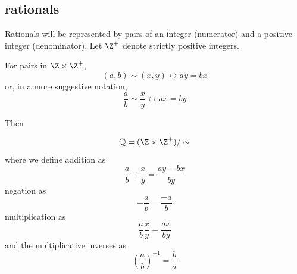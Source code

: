 \documentclass{scrbook}
\renewcommand{\iff}{\leftrightarrow}
\newcommand{\Q}{\mathbb{Q}}
\begin{document}
\subsection[Rationals]{rationals}
Rationals will be represented by pairs of an integer (numerator) and a positive integer (denominator). Let $\Z^+$ denote strictly positive integers. 
\begin{defn}[\sim]
  For pairs in $\Z\times \Z^+$,
  \[
  (a,b)\sim(x,y) \iff ay=bx
  \]
  or, in a more suggestive notation, 
  \[
  \frac a b \sim \frac x y \iff ax = by
  \]
\end{defn}
Then
\begin{defn}[$\Q$]
  \[
  \Q=(\Z\times\Z^+)/\sim
  \]
  where we define addition as
  \[
  \frac ab + \frac xy = \frac{ay+bx}{by}
  \]
  negation as
  \[
  -\frac ab = \frac{-a}b
  \]
  multiplication as
  \[
  \frac ab \frac xy = \frac {ax}{by}
  \]
  and the multiplicative inverses as
  \[
  \left(\frac ab\right)^{-1} = \frac ba
  \]
\end{defn}
\end{document}

